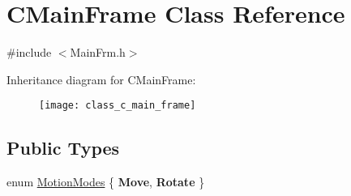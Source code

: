 \hypertarget{class_c_main_frame}{\section{C\+Main\+Frame Class Reference}
\label{class_c_main_frame}
}


{\ttfamily \#include $<$Main\+Frm.\+h$>$}

Inheritance diagram for C\+Main\+Frame\+:\begin{figure}[H]
\begin{center}
\leavevmode
\texttt{[image: class\_c\_main\_frame]}
\end{center}
\end{figure}
\subsection*{Public Types}
\begin{DoxyCompactItemize}
\item 
enum \hyperlink{class_c_main_frame_a89722c82d82f95a761772a8dd9755b7b}{Motion\+Modes} \{ {\bfseries Move}, 
{\bfseries Rotate}
 \}
\end{DoxyCompactItemize}
